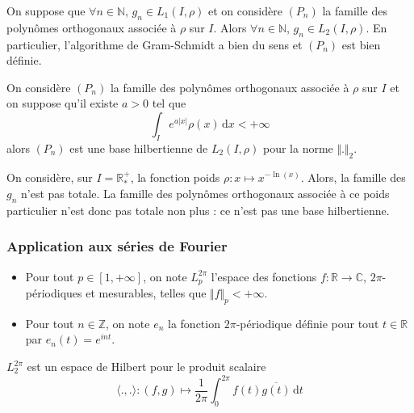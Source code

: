 
  \begin{lemma}
    On suppose que $\forall n \in \mathbb{N}$, $g_n \in L_1(I, \rho)$ et on considère $(P_n)$ la famille des polynômes orthogonaux associée à $\rho$ sur $I$. Alors $\forall n \in \mathbb{N}$, $g_n \in L_2(I, \rho)$. En particulier, l'algorithme de Gram-Schmidt a bien du sens et $(P_n)$ est bien définie.
  \end{lemma}


  \begin{application}
    On considère $(P_n)$ la famille des polynômes orthogonaux associée à $\rho$ sur $I$ et on suppose qu'il existe $a > 0$ tel que
    \[ \int_I e^{a \vert x \vert} \rho(x) \, \mathrm{d}x < +\infty \]
    alors $(P_n)$ est une base hilbertienne de $L_2(I, \rho)$ pour la norme $\Vert . \Vert_2$.
  \end{application}

  \begin{cexample}
    On considère, sur $I = \mathbb{R}^+_*$, la fonction poids $\rho : x \mapsto x^{-\ln(x)}$. Alors, la famille des $g_n$ n'est pas totale. La famille des polynômes orthogonaux associée à ce poids particulier n'est donc pas totale non plus : ce n'est pas une base hilbertienne.
  \end{cexample}

  \subsubsection{Application aux séries de Fourier}


  \begin{notation}
    \begin{itemize}
      \item Pour tout $p \in [1, +\infty]$, on note $L_p^{2\pi}$ l'espace des fonctions $f : \mathbb{R} \rightarrow \mathbb{C}$, $2\pi$-périodiques et mesurables, telles que $\Vert f \Vert_p < +\infty$.
      \item Pour tout $n \in \mathbb{Z}$, on note $e_n$ la fonction $2\pi$-périodique définie pour tout $t \in \mathbb{R}$ par $e_n(t) = e^{int}$.
    \end{itemize}
  \end{notation}

  \begin{proposition}
    $L_2^{2\pi}$ est un espace de Hilbert pour le produit scalaire
    \[ \langle ., . \rangle : (f, g) \mapsto \frac{1}{2 \pi} \int_0^{2\pi} f(t) \overline{g(t)} \, \mathrm{d}t \]
  \end{proposition}

